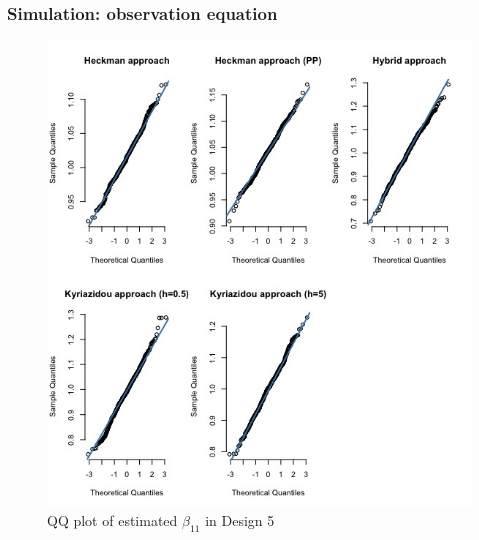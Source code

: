 \begin{frame}[label = qqplots]
    \frametitle{Simulation: observation equation}
    \begin{figure}[htbp]
        \centerline{\includegraphics[scale=.3]{content/Figures/QQ_beta_11_Design5.png}}
        \caption{\footnotesize{QQ plot of estimated $\beta_{11}$ in Design 5}}
        \label{QQ_beta_11_Design5}
      \end{figure}
    \end{frame}
